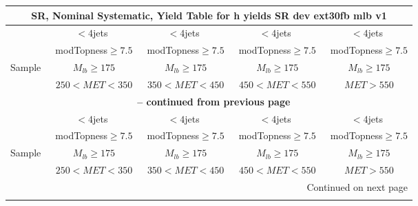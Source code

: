 \documentclass{article}
\begin{document}
\begin{longtable}{|l|c|c|c|c|} 
 
\multicolumn{5}{c}{ SR, Nominal Systematic, Yield Table for h yields SR dev ext30fb mlb v1 }\\* \hline 
  & $<4$jets  & $<4$jets  & $<4$jets  & $<4$jets \\* 
  & ~modTopness$\ge7.5$  & ~modTopness$\ge7.5$  & ~modTopness$\ge7.5$  & ~modTopness$\ge7.5$ \\* 
Sample  & ~$M_{lb}\ge175$  & ~$M_{lb}\ge175$  & ~$M_{lb}\ge175$  & ~$M_{lb}\ge175$ \\* 
  & ~$250<MET<350$  & ~$350<MET<450$  & ~$450<MET<550$  & ~$MET>550$ \\* 
\hline \hline 
\endfirsthead 
 
\multicolumn{5}{c}{{\bfseries \tablename\ \thetable{} -- continued from previous page}}\\* \hline 
  & $<4$jets  & $<4$jets  & $<4$jets  & $<4$jets \\* 
  & ~modTopness$\ge7.5$  & ~modTopness$\ge7.5$  & ~modTopness$\ge7.5$  & ~modTopness$\ge7.5$ \\* 
Sample  & ~$M_{lb}\ge175$  & ~$M_{lb}\ge175$  & ~$M_{lb}\ge175$  & ~$M_{lb}\ge175$ \\* 
  & ~$250<MET<350$  & ~$350<MET<450$  & ~$450<MET<550$  & ~$MET>550$ \\* 
\hline \hline 
\endhead 
 
\multicolumn{5}{|r|}{{Continued on next page}}\\* \hline 
\endfoot 
 
 
\endlastfoot 
 

\end{longtable}
\end{document}
